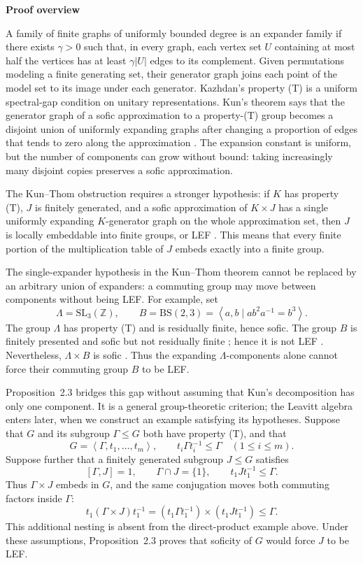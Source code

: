\documentclass[10pt]{article}
\newcommand{\Z}{\mathbb{Z}}
\newcommand{\subhead}[1]{\par\medskip\noindent\textbf{#1}\par\smallskip}
\newcommand{\abs}[1]{\left|#1\right|}
\newcommand{\angles}[1]{\left\langle #1\right\rangle}
\begin{document}
\subhead{Proof overview}
A family of finite graphs of uniformly bounded degree is an expander family if there exists $\gamma>0$ such that, in every graph, each vertex set $U$ containing at most half the vertices has at least $\gamma\abs{U}$ edges to its complement. Given permutations modeling a finite generating set, their generator graph joins each point of the model set to its image under each generator. Kazhdan's property (T) is a uniform spectral-gap condition on unitary representations. Kun's theorem says that the generator graph of a sofic approximation to a property-(T) group becomes a disjoint union of uniformly expanding graphs after changing a proportion of edges that tends to zero along the approximation \cite[Theorem~1]{Kun19}. The expansion constant is uniform, but the number of components can grow without bound: taking increasingly many disjoint copies preserves a sofic approximation.

The Kun--Thom obstruction requires a stronger hypothesis: if $K$ has property (T), $J$ is finitely generated, and a sofic approximation of $K\times J$ has a single uniformly expanding $K$-generator graph on the whole approximation set, then $J$ is locally embeddable into finite groups, or LEF \cite[Theorem~1.1]{KT19}. This means that every finite portion of the multiplication table of $J$ embeds exactly into a finite group.

The single-expander hypothesis in the Kun--Thom theorem cannot be replaced by an arbitrary union of expanders: a commuting group may move between components without being LEF. For example, set
\[
\Lambda=\mathrm{SL}_3(\Z),\qquad B=\mathrm{BS}(2,3)=\angles{a,b\mid ab^2a^{-1}=b^3}.
\]
The group $\Lambda$ has property (T) and is residually finite, hence sofic. The group $B$ is finitely presented and sofic but not residually finite \cite[Example~4.6]{Pes08}; hence it is not LEF \cite[Theorem~2.2]{VG97}. Nevertheless, $\Lambda\times B$ is sofic \cite[Theorem~1(1)]{ES06}. Thus the expanding $\Lambda$-components alone cannot force their commuting group $B$ to be LEF.

Proposition~2.3 bridges this gap without assuming that Kun's decomposition has only one component. It is a general group-theoretic criterion; the Leavitt algebra enters later, when we construct an example satisfying its hypotheses. Suppose that $G$ and its subgroup $\Gamma\leq G$ both have property (T), and that
\[
G=\angles{\Gamma,t_1,\ldots,t_m},\qquad t_i\Gamma t_i^{-1}\leq\Gamma\quad(1\leq i\leq m).
\]
Suppose further that a finitely generated subgroup $J\leq G$ satisfies
\[
[\Gamma,J]=1,\qquad \Gamma\cap J=\{1\},\qquad t_1Jt_1^{-1}\leq\Gamma.
\]
Thus $\Gamma\times J$ embeds in $G$, and the same conjugation moves both commuting factors inside $\Gamma$:
\[
t_1(\Gamma\times J)t_1^{-1}=(t_1\Gamma t_1^{-1})\times(t_1Jt_1^{-1})\leq\Gamma.
\]
This additional nesting is absent from the direct-product example above. Under these assumptions, Proposition~2.3 proves that soficity of $G$ would force $J$ to be LEF.
\end{document}
